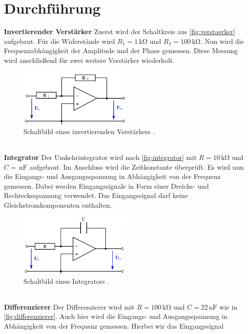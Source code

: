 \section{Durchführung}
\label{sec:Durchführung}

\textbf{Invertierender Verstärker}
Zuerst wird der Schaltkreis aus \autoref{fig:verstaerker} aufgebaut. Für die Widerstände wird
$R_1 = 1 \,\unit{\kilo\ohm}$ und $R_2 = 100 \,\unit{\kilo\ohm}$. Nun wird die Frequenzabhängigkeit der
Amplitude und der Phase gemessen. Diese Messung wird anschließend für zwei weitere Verstärker wiederholt.
\begin{figure}
    \centering
    \includegraphics[width=0.5\textwidth]{invertierend.png}
    \caption{Schaltbild eines invertierenden Verstärkers \cite{ap51}.}
    \label{fig:verstaerker}
\end{figure}
\\
\textbf{Integrator}
Der Umkehrintegrator wird nach \autoref{fig:integrator} mit $R = 10\,\unit{\kilo\ohm}$ und 
$C = \,\text{nF}$ aufgebaut. Im Anschluss wird die Zeitkonstante überprüft. 
Es wird nun die Eingangs- und Ausgangsspannung in Abhängigkeit von der Frequenz gemessen. 
Dabei werden Eingangssignale in Form einer Dreicks- und Rechtecksspannung verwendet. Das Eingangssignal 
darf keine Gleichstromkomponenten enthalten.
\begin{figure}
    \centering
    \includegraphics[width=0.5\textwidth]{integrator.png}
    \caption{Schaltbild eines Integrators \cite{ap51}.}
    \label{fig:integrator}
\end{figure}
\\
\textbf{Differenzierer}
Der Differenzierer wird mit $R=100\,\unit{\kilo\ohm}$ und $C=22\,\text{nF}$ wie in \autoref{fig:differenzierer}.
Auch hier wird die Eingangs- und Ausgangsspannung in Abhängigkeit von der Frequenz gemessen. Hierbei wir das Eingangssignal 
